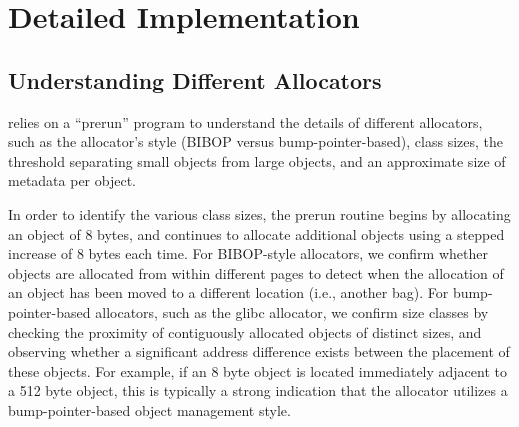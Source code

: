 \section{Detailed Implementation}

\label{sec:implement}





\subsection{Understanding Different Allocators}

\label{sec:understandingallocators}

\MP{} relies on a ``prerun'' program to understand the details of different allocators, such as the allocator's style (BIBOP versus bump-pointer-based), class sizes, the threshold separating small objects from large objects, and an approximate size of metadata per object. 

In order to identify the various class sizes, the prerun routine begins by allocating an object of 8 bytes, and continues to allocate  additional objects using a stepped increase of 8 bytes each time. For BIBOP-style allocators, we confirm whether objects are allocated from within different pages to detect when the allocation of an object has been moved to a different location (i.e., another bag). 
For bump-pointer-based allocators, such as the glibc allocator, we confirm size classes by checking the proximity of contiguously allocated objects of distinct sizes, and observing whether a significant address difference exists between the placement of these objects. For example, if an 8 byte object is located immediately adjacent to a 512 byte object, this is typically a strong indication that the allocator utilizes a bump-pointer-based object management style.

